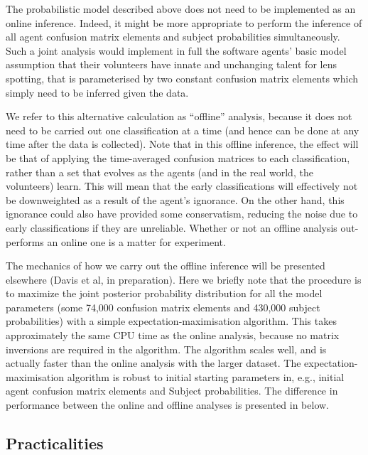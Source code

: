 \documentclass[useAMS,usenatbib,a4paper]{mn2e}
\begin{document}
The probabilistic model described above does not need to be implemented as an
online inference. Indeed, it might be more appropriate to perform the inference
of all agent confusion matrix elements and subject probabilities simultaneously.
Such a joint analysis would implement in full the software agents' basic model assumption
that their volunteers have innate and unchanging talent for lens spotting, that
is parameterised by two constant confusion matrix elements which simply need to
be inferred given the data.

We refer to this alternative calculation as ``offline'' analysis, because it
does not need to be carried out one classification at a time (and hence can be
done at any time after the data is collected). Note that in this offline
inference, the effect will be that of applying the time-averaged confusion
matrices to each classification,  rather than a set that evolves as the agents
(and in the real world, the volunteers) learn. This will mean  that the early
classifications will effectively not be downweighted as a result of the agent's
ignorance. On the other hand, this ignorance could also have provided some
conservatism, reducing the noise due to early classifications if they are
unreliable. Whether or not an offline analysis out-performs an online one is a
matter for experiment.

The mechanics of how we carry out the offline inference  will be presented
elsewhere (Davis et al, in preparation). Here we briefly note that the procedure
is to maximize the joint posterior probability distribution for all the model
parameters (some 74,000 confusion matrix elements and 430,000 subject
probabilities) with a simple expectation-maximisation algorithm. This takes
approximately the same CPU time as the \StageTwo online analysis, because no
matrix inversions are required in the algorithm. The algorithm scales well, and
is actually faster than the online analysis with the larger \StageOne dataset.
The expectation-maximisation algorithm is robust to initial starting parameters
in, e.g., initial agent confusion matrix elements and Subject probabilities. The
difference in performance between the online and offline analyses is presented
in   below.



\subsection{Practicalities}
\label{sec:swap:practicalities}
\end{document}
